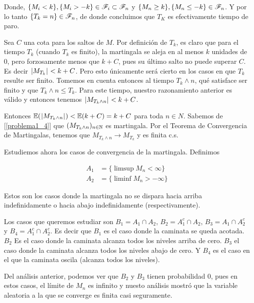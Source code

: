 Donde, $\{ M_i < k \}, \{ M_i > -k \} \in \mathscr{F}_i \subset \mathscr{F}_n$ y $\{ M_n \geq k \}, \{ M_n \leq -k \} \in \mathscr{F}_n$. 
Y por lo tanto $\{ T_k = n\} \in \mathscr{F}_n$, de donde concluimos que $T_K$ es efectivamente tiempo de paro.\par\null


Sea $C$ una cota para los saltos de $M$. Por definición de $T_k$, es claro que para el tiempo $T_k$ (cuando $T_k$ es finito), 
la martingala se aleja en al menos $k$ unidades de 0, pero forzosamente menos que $k + C$, pues su último salto no 
puede superar $C$. Es decir $\hspace{.25mm}\left|M_{T_k}\right|\hspace{.25mm} < k + C$. Pero esto únicamente será cierto en los casos en que $T_k$ resulte 
ser finito. Tomemos en cuenta entonces al tiempo $T_k \wedge n$, qué satisface ser finito y que $T_k \wedge n \leq T_k$. 
Para este tiempo, nuestro razonamiento anterior es válido y entonces tenemos $\hspace{.25mm}\left|M_{T_k \wedge n}\right|\hspace{.25mm} < k + C$.\par\null

Entonces $\mathbb{E}(\hspace{.25mm}\left|M_{T_k \wedge n}\right|\hspace{.25mm}) < \mathbb{E}(k + C) = k + C$ para toda $n \in N$. Sabemos de [\ref{problema1_4}] que 
$(M_{T_k \wedge n})_{n \in \mathbb{N}}$ es martingala. Por el Teorema de Convergencia de Martingalas, tenemos que 
$M_{T_k \wedge n} \longrightarrow M_{T_k}$ y es finita c.s.\par\null

Estudiemos ahora los casos de convergencia de la martingala. Definimos

\begin{align}
        A_1     &=  \{ \limsup M_n < \infty     \}    \\
        A_2     &=  \{ \liminf M_n > -\infty    \}
\end{align}

Estos son los casos donde la martingala no se dispara hacia arriba indefinidamente o hacia abajo indefinidamente
(respectivamente).\par\null

Los casos que queremos estudiar son $B_1 = A_1 \cap A_2$, $B_2 = A_1^c \cap A_2$, $B_3 = A_1 \cap A_2^c$ y 
$B_4 = A_1^c \cap A_2^c$. Es decir que $B_1$ es el caso donde la caminata se queda acotada. $B_2$ Es el caso 
donde la caminata alcanza todos los niveles arriba de cero. $B_3$ el caso donde la caminata alcanza todos 
los niveles abajo de cero. Y $B_4$ es el caso en el que la caminata oscila (alcanza todos los niveles).\par\null

Del análisis anterior, podemos ver que $B_2$ y $B_3$ tienen probabilidad 0, pues en estos casos, el límite de
$M_n$ es infinito y nuesto análisis mostró que la variable aleatoria a la que se converge es finita casi seguramente.\par\null


